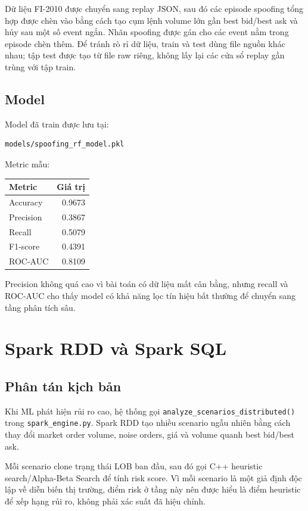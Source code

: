 \documentclass[12pt,a4paper]{report}
\begin{document}
Dữ liệu FI-2010 được chuyển sang replay JSON, sau đó các episode spoofing tổng hợp được chèn vào bằng cách tạo cụm lệnh volume lớn gần best bid/best ask và hủy sau một số event ngắn. Nhãn spoofing được gán cho các event nằm trong episode chèn thêm. Để tránh rò rỉ dữ liệu, train và test dùng file nguồn khác nhau; tập test được tạo từ file raw riêng, không lấy lại các cửa sổ replay gần trùng với tập train.

\section{Model}

Model đã train được lưu tại:

\begin{lstlisting}
models/spoofing_rf_model.pkl
\end{lstlisting}

Metric mẫu:

\begin{longtable}{lr}
\toprule
\textbf{Metric} & \textbf{Giá trị} \\
\midrule
Accuracy & 0.9673 \\
Precision & 0.3867 \\
Recall & 0.5079 \\
F1-score & 0.4391 \\
ROC-AUC & 0.8109 \\
\bottomrule
\end{longtable}

Precision không quá cao vì bài toán có dữ liệu mất cân bằng, nhưng recall và ROC-AUC cho thấy model có khả năng lọc tín hiệu bất thường để chuyển sang tầng phân tích sâu.

\chapter{Spark RDD và Spark SQL}

\section{Phân tán kịch bản}

Khi ML phát hiện rủi ro cao, hệ thống gọi \texttt{analyze\_scenarios\_distributed()} trong \texttt{spark\_engine.py}. Spark RDD tạo nhiều scenario ngẫu nhiên bằng cách thay đổi market order volume, noise orders, giá và volume quanh best bid/best ask.

Mỗi scenario clone trạng thái LOB ban đầu, sau đó gọi C++ heuristic search/Alpha-Beta Search để tính risk score. Vì mỗi scenario là một giả định độc lập về diễn biến thị trường, điểm risk ở tầng này nên được hiểu là điểm heuristic để xếp hạng rủi ro, không phải xác suất đã hiệu chỉnh.
\end{document}
